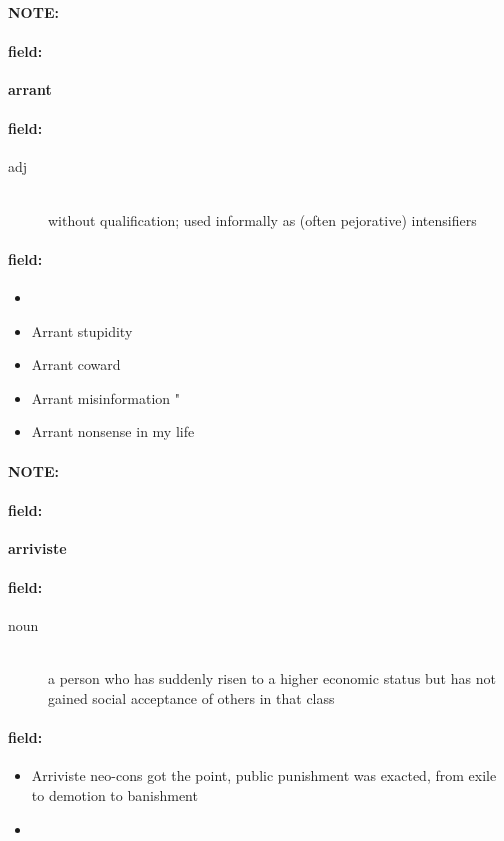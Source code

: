 \documentclass[12pt]{article}
\newenvironment{note}{\paragraph{NOTE:}}{}
\newenvironment{field}{\paragraph{field:}}{}
\begin{document}
\begin{note}
\begin{field}
\textbf{\large arrant}
\end{field}


\begin{field}
\begin{description}
\item[adj] \hfill \\ 
without qualification; used informally as (often pejorative) intensifiers

\end{description}
\end{field}

\begin{field}
\begin{itemize}
\item 
\item Arrant stupidity
\item Arrant coward
\item Arrant misinformation " 
\item Arrant nonsense in my life
\end{itemize}
\end{field}
\end{note}
\begin{note}
\begin{field}
\textbf{\large arriviste}
\end{field}


\begin{field}
\begin{description}
\item[noun] \hfill \\ 
a person who has suddenly risen to a higher economic status but has not gained social acceptance of others in that class

\end{description}
\end{field}

\begin{field}
\begin{itemize}
\item Arriviste neo-cons got the point, public punishment was exacted, from exile to demotion to banishment
\item 
\end{itemize}
\end{field}
\end{note}
\end{document}
